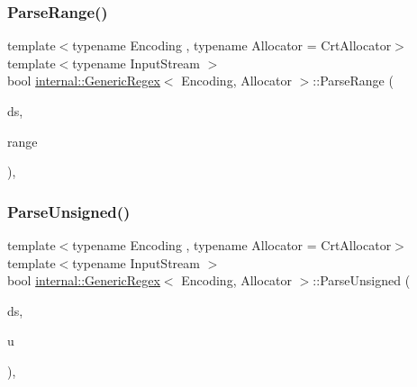 \subsubsection{\texorpdfstring{Parse\+Range()}{ParseRange()}}
{\footnotesize\ttfamily template$<$typename Encoding , typename Allocator  = Crt\+Allocator$>$ \\
template$<$typename Input\+Stream $>$ \\
bool \hyperlink{classinternal_1_1GenericRegex}{internal\+::\+Generic\+Regex}$<$ Encoding, Allocator $>$\+::Parse\+Range (\begin{DoxyParamCaption}\item[{\hyperlink{classinternal_1_1DecodedStream}{Decoded\+Stream}$<$ Input\+Stream, Encoding $>$ \&}]{ds,  }\item[{\hyperlink{rapidjson_8h_a5ed6e6e67250fadbd041127e6386dcb5}{Size\+Type} $\ast$}]{range }\end{DoxyParamCaption})\hspace{0.3cm}{\ttfamily [inline]}, {\ttfamily [private]}}

\mbox{\label{classinternal_1_1GenericRegex_a16d0bf927741c666f46eed1c66f04150}} 
\subsubsection{\texorpdfstring{Parse\+Unsigned()}{ParseUnsigned()}}
{\footnotesize\ttfamily template$<$typename Encoding , typename Allocator  = Crt\+Allocator$>$ \\
template$<$typename Input\+Stream $>$ \\
bool \hyperlink{classinternal_1_1GenericRegex}{internal\+::\+Generic\+Regex}$<$ Encoding, Allocator $>$\+::Parse\+Unsigned (\begin{DoxyParamCaption}\item[{\hyperlink{classinternal_1_1DecodedStream}{Decoded\+Stream}$<$ Input\+Stream, Encoding $>$ \&}]{ds,  }\item[{unsigned $\ast$}]{u }\end{DoxyParamCaption})\hspace{0.3cm}{\ttfamily [inline]}, {\ttfamily [private]}}

\mbox{\label{classinternal_1_1GenericRegex_a90c5c230de4794560971c48e15861f8e}} 
